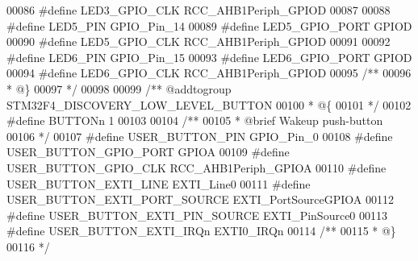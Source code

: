 \begin{DoxyCode}
00086 \textcolor{preprocessor}{#}\textcolor{preprocessor}{define} \textcolor{preprocessor}{LED3\_GPIO\_CLK}                    RCC_AHB1Periph_GPIOD
00087 
00088 \textcolor{preprocessor}{#}\textcolor{preprocessor}{define} \textcolor{preprocessor}{LED5\_PIN}                         GPIO_Pin_14
00089 \textcolor{preprocessor}{#}\textcolor{preprocessor}{define} \textcolor{preprocessor}{LED5\_GPIO\_PORT}                   GPIOD
00090 \textcolor{preprocessor}{#}\textcolor{preprocessor}{define} \textcolor{preprocessor}{LED5\_GPIO\_CLK}                    RCC_AHB1Periph_GPIOD
00091 
00092 \textcolor{preprocessor}{#}\textcolor{preprocessor}{define} \textcolor{preprocessor}{LED6\_PIN}                         GPIO_Pin_15
00093 \textcolor{preprocessor}{#}\textcolor{preprocessor}{define} \textcolor{preprocessor}{LED6\_GPIO\_PORT}                   GPIOD
00094 \textcolor{preprocessor}{#}\textcolor{preprocessor}{define} \textcolor{preprocessor}{LED6\_GPIO\_CLK}                    RCC_AHB1Periph_GPIOD
00095 \textcolor{comment}{/**}
00096 \textcolor{comment}{  * @\}}
00097 \textcolor{comment}{  */}
00098 
00099 \textcolor{comment}{/** @addtogroup STM32F4\_DISCOVERY\_LOW\_LEVEL\_BUTTON}
00100 \textcolor{comment}{  * @\{}
00101 \textcolor{comment}{  */}
00102 \textcolor{preprocessor}{#}\textcolor{preprocessor}{define} \textcolor{preprocessor}{BUTTONn}                          1
00103 
00104 \textcolor{comment}{/**}
00105 \textcolor{comment}{ * @brief Wakeup push-button}
00106 \textcolor{comment}{ */}
00107 \textcolor{preprocessor}{#}\textcolor{preprocessor}{define} \textcolor{preprocessor}{USER\_BUTTON\_PIN}                GPIO_Pin_0
00108 \textcolor{preprocessor}{#}\textcolor{preprocessor}{define} \textcolor{preprocessor}{USER\_BUTTON\_GPIO\_PORT}          GPIOA
00109 \textcolor{preprocessor}{#}\textcolor{preprocessor}{define} \textcolor{preprocessor}{USER\_BUTTON\_GPIO\_CLK}           RCC_AHB1Periph_GPIOA
00110 \textcolor{preprocessor}{#}\textcolor{preprocessor}{define} \textcolor{preprocessor}{USER\_BUTTON\_EXTI\_LINE}          EXTI_Line0
00111 \textcolor{preprocessor}{#}\textcolor{preprocessor}{define} \textcolor{preprocessor}{USER\_BUTTON\_EXTI\_PORT\_SOURCE}   EXTI_PortSourceGPIOA
00112 \textcolor{preprocessor}{#}\textcolor{preprocessor}{define} \textcolor{preprocessor}{USER\_BUTTON\_EXTI\_PIN\_SOURCE}    EXTI_PinSource0
00113 \textcolor{preprocessor}{#}\textcolor{preprocessor}{define} \textcolor{preprocessor}{USER\_BUTTON\_EXTI\_IRQn}          \textcolor{preprocessor}{EXTI0\_IRQn}
00114 \textcolor{comment}{/**}
00115 \textcolor{comment}{  * @\}}
00116 \textcolor{comment}{  */}

\end{DoxyCode}
